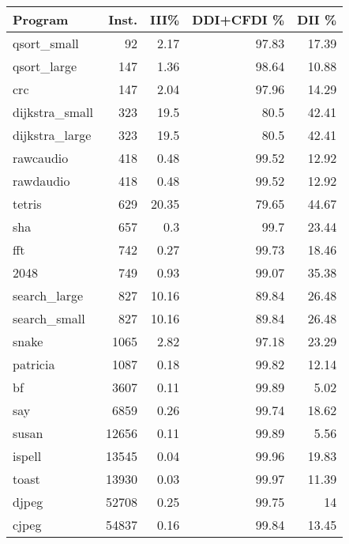 \begin{tabular}{lrrrr}
\hline
 Program        &   Inst. &   III\% &   DDI+CFDI \% &   DII \% \\
\hline
 qsort\_small    &      92 &   2.17 &        97.83 &   17.39 \\
 qsort\_large    &     147 &   1.36 &        98.64 &   10.88 \\
 crc            &     147 &   2.04 &        97.96 &   14.29 \\
 dijkstra\_small &     323 &  19.5  &        80.5  &   42.41 \\
 dijkstra\_large &     323 &  19.5  &        80.5  &   42.41 \\
 rawcaudio      &     418 &   0.48 &        99.52 &   12.92 \\
 rawdaudio      &     418 &   0.48 &        99.52 &   12.92 \\
 tetris         &     629 &  20.35 &        79.65 &   44.67 \\
 sha            &     657 &   0.3  &        99.7  &   23.44 \\
 fft            &     742 &   0.27 &        99.73 &   18.46 \\
 2048           &     749 &   0.93 &        99.07 &   35.38 \\
 search\_large   &     827 &  10.16 &        89.84 &   26.48 \\
 search\_small   &     827 &  10.16 &        89.84 &   26.48 \\
 snake          &    1065 &   2.82 &        97.18 &   23.29 \\
 patricia       &    1087 &   0.18 &        99.82 &   12.14 \\
 bf             &    3607 &   0.11 &        99.89 &    5.02 \\
 say            &    6859 &   0.26 &        99.74 &   18.62 \\
 susan          &   12656 &   0.11 &        99.89 &    5.56 \\
 ispell         &   13545 &   0.04 &        99.96 &   19.83 \\
 toast          &   13930 &   0.03 &        99.97 &   11.39 \\
 djpeg          &   52708 &   0.25 &        99.75 &   14    \\
 cjpeg          &   54837 &   0.16 &        99.84 &   13.45 \\
\hline
\end{tabular}

